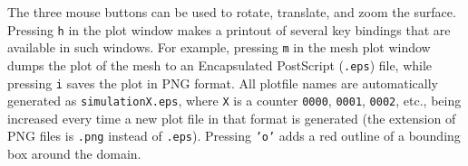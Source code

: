 The three mouse buttons can be used to rotate, translate, and zoom
the surface.
Pressing {\fontsize{12pt}{12pt}\texttt{h}} in the plot window makes a printout of several
key bindings that are available in such windows. For example,
pressing {\fontsize{12pt}{12pt}\texttt{m}} in the mesh plot window
dumps the plot of the mesh to an Encapsulated PostScript ({\fontsize{12pt}{12pt}\texttt{.eps}})
file, while pressing {\fontsize{12pt}{12pt}\texttt{i}} saves the plot in PNG format.
All plotfile names are automatically generated as {\fontsize{12pt}{12pt}\texttt{simulationX.eps}},
where {\fontsize{12pt}{12pt}\texttt{X}} is a counter {\fontsize{12pt}{12pt}\texttt{0000}}, {\fontsize{12pt}{12pt}\texttt{0001}}, {\fontsize{12pt}{12pt}\texttt{0002}}, etc.,
being increased every time a new plot file in that format
is generated (the extension
of PNG files is {\fontsize{12pt}{12pt}\texttt{.png}} instead of {\fontsize{12pt}{12pt}\texttt{.eps}}).
Pressing {\fontsize{12pt}{12pt}\texttt{'o'}} adds a red outline of a bounding box around the domain.

